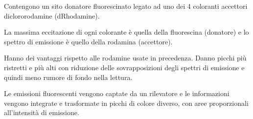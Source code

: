 \documentclass[11pt]{book}
\begin{document}
Contengono un sito donatore fluorescinato legato ad uno dei 4 coloranti
accettori diclororodamine (dRhodamine).

La massima eccitazione di ogni colorante è quella della fluorescina
(donatore) e lo spettro di emissione è quello della rodamina
(accettore).

Hanno dei vantaggi rispetto alle rodamine usate in precedenza. Danno
picchi più ristretti e più alti con riduzione delle sovrapposizioni
degli spettri di emissione e quindi meno rumore di fondo nella lettura.

Le emissioni fluorescenti vengono captate da un rilevatore e le
informazioni vengono integrate e trasformate in picchi di colore
diverso, con aree proporzionali all'intensità di emissione.
\end{document}

